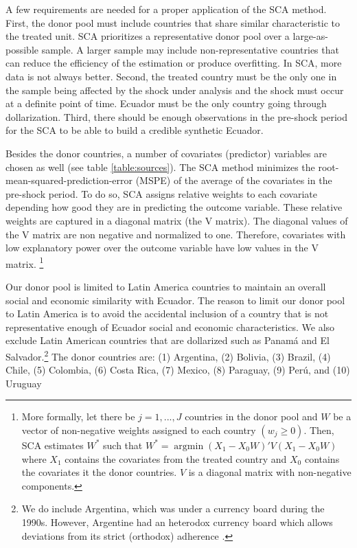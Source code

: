\documentclass[12pt]{article}
\begin{document}
A few requirements are needed for a proper application of the SCA method. First, the donor pool must include countries that share similar characteristic to the treated unit. SCA prioritizes a representative donor pool over a large-as-possible sample. A larger sample may include non-representative countries that can reduce the efficiency of the estimation or produce overfitting. In SCA, more data is not always better. Second, the treated country must be the only one in the sample being affected by the shock under analysis and the shock must occur at a definite point of time. Ecuador must be the only country going through dollarization. Third, there should be enough observations in the pre-shock period for the SCA to be able to build a credible synthetic Ecuador.

Besides the donor countries, a number of covariates (predictor) variables are chosen as well (see table \ref{table:sources}). The SCA method minimizes the root-mean-squared-prediction-error (MSPE) of the average of the covariates in the pre-shock period. To do so, SCA assigns relative weights to each covariate depending how good they are in predicting the outcome variable. These relative weights are captured in a diagonal matrix (the V matrix). The diagonal values of the V matrix are non negative and normalized to one. Therefore, covariates with low explanatory power over the outcome variable have low values in the V matrix. \footnote{More formally, let there be $j = 1,...,J$ countries in the donor pool and $W$ be a vector of non-negative weights assigned to each country $(w_j \geq 0)$. Then, SCA estimates $W^*$ such that $W^* = \operatorname{arg\min} (X_1 - X_0W)'V(X_1 - X_0W)$ where $X_1$ contains the covariates from the treated country and $X_0$ contains the covariates it the donor countries. $V$ is a diagonal matrix with non-negative components.}

Our donor pool is limited to Latin America countries to maintain an overall social and economic similarity with Ecuador. The reason to limit our donor pool to Latin America is to avoid the accidental inclusion of a country that is not representative enough of Ecuador social and economic characteristics. We also exclude Latin American countries that are dollarized such as Panamá and El Salvador.\footnote{We do include Argentina, which was under a currency board during the 1990s. However, Argentine had an heterodox currency board which allows deviations from its strict (orthodox) adherence \parencite{Hanke2008}.} The donor countries are: (1) Argentina, (2) Bolivia, (3) Brazil, (4) Chile, (5) Colombia, (6) Costa Rica, (7) Mexico, (8) Paraguay, (9) Perú, and (10) Uruguay
\end{document}
